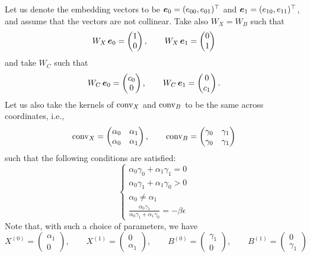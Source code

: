 Let us denote the embedding vectors to be $\boldsymbol{e}_0 = (e_{00}, e_{01})^\top$ and $\boldsymbol{e}_1 = (e_{10},e_{11})^\top$, and assume that the vectors are not collinear. Take also $W_X = W_B$ such that
\begin{equation}
W_X \,\boldsymbol{e}_0 = \begin{pmatrix}
    1 \\
    0
\end{pmatrix}, \qquad
W_X \,\boldsymbol{e}_1 = \begin{pmatrix}
    0 \\
    1
\end{pmatrix}
\end{equation}
and take $W_C$ such that
\begin{equation}
W_C \,\boldsymbol{e}_0 = \begin{pmatrix}
    c_0 \\
    0
\end{pmatrix}, \qquad
W_C \,\boldsymbol{e}_1 = \begin{pmatrix}
    0 \\
    c_1
\end{pmatrix}.
\end{equation}
Let us also take the kernels of $\mathrm{conv}_X$ and $\mathrm{conv}_B$ to be the same across coordinates, i.e., 
\begin{equation}
\mathrm{conv}_X = \begin{pmatrix}
    \alpha_{0} &\alpha_{1} \\
    \alpha_{0} &\alpha_{1}
\end{pmatrix}, \qquad 
\mathrm{conv}_B = \begin{pmatrix}
    \gamma_{0} &\gamma_{1} \\
    \gamma_{0} &\gamma_{1}
\end{pmatrix}
\end{equation}
such that the following conditions are satisfied:
\begin{equation}
\begin{cases}
\alpha_0\gamma_0 + \alpha_1\gamma_1 = 0 \\
\alpha_0\gamma_1 + \alpha_1\gamma_0 > 0 \\
\alpha_0 \neq \alpha_1 \\
\frac{\alpha_0 \gamma_1}{\alpha_0 \gamma_1 + \alpha_1 \gamma_0} = -\beta \epsilon
\end{cases}
\end{equation}
Note that, with such a choice of parameters, we have
\begin{equation}
X^{(0)} = \begin{pmatrix}
\alpha_1 \\
0
\end{pmatrix}, \qquad
X^{(1)} = \begin{pmatrix}
0 \\
\alpha_1
\end{pmatrix}, \qquad
B^{(0)} = \begin{pmatrix}
\gamma_1 \\
0
\end{pmatrix}, \qquad
B^{(1)} = \begin{pmatrix}
0 \\
\gamma_1
\end{pmatrix}
\end{equation}
